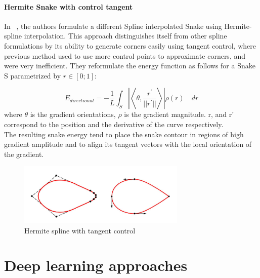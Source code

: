 \documentclass[main.tex]{subfiles}
\begin{document}
\paragraph{Hermite Snake with control tangent} In ~\cite{Uhlmann2016}, the authors formulate a different Spline interpolated Snake using Hermite-spline interpolation. This approach distinguishes itself from other spline formulations by its ability to generate corners easily using tangent control, where previous method used to use more control points to approximate corners, and were very inefficient. They reformulate the energy function as follows for a Snake S parametrized by $r \in [0;1]$:

\begin{equation}
    E_{\mathit{directional}} = -\frac{1}{L} \int_{S}\left| \left< \theta, \frac{r^{'}}{||r^{'}||}\right>\right| \rho(r) \quad dr
\end{equation}
where $\theta$ is the gradient orientations, $\rho$ is the gradient magnitude. r, and r' correspond to the position and the derivative of the curve respectively.\\

The resulting snake energy tend to place the snake contour in regions of high gradient amplitude  and to align its tangent vectors with the local orientation of the gradient.

\begin{figure}[H]
    \centering
    \includegraphics[width=8cm]{images/hermite.PNG}
    \caption{Hermite spline with tangent control}
    \label{fig:ac}
\end{figure}


\section{Deep learning approaches}
\end{document}
